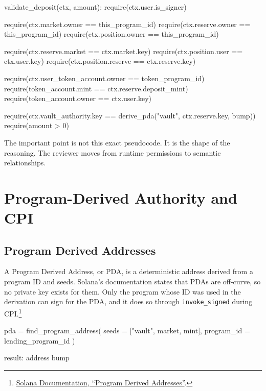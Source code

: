 \begin{codeblock}
validate_deposit(ctx, amount):
    require(ctx.user.is_signer)

    require(ctx.market.owner == this_program_id)
    require(ctx.reserve.owner == this_program_id)
    require(ctx.position.owner == this_program_id)

    require(ctx.reserve.market == ctx.market.key)
    require(ctx.position.user == ctx.user.key)
    require(ctx.position.reserve == ctx.reserve.key)

    require(ctx.user_token_account.owner == token_program_id)
    require(token_account.mint == ctx.reserve.deposit_mint)
    require(token_account.owner == ctx.user.key)

    require(ctx.vault_authority.key == derive_pda("vault", ctx.reserve.key, bump))
    require(amount > 0)
\end{codeblock}

The important point is not this exact pseudocode. It is the shape of the reasoning. The reviewer moves from runtime permissions to semantic relationships.

\section{Program-Derived Authority and CPI}

\subsection{Program Derived Addresses}

A Program Derived Address, or PDA, is a deterministic address derived from a program ID and seeds. Solana's documentation states that PDAs are off-curve, so no private key exists for them. Only the program whose ID was used in the derivation can sign for the PDA, and it does so through \texttt{invoke\_signed} during CPI.\footnote{\href{https://solana.com/docs/core/pda}{Solana Documentation, ``Program Derived Addresses''}.}

\begin{codeblock}
pda = find_program_address(
    seeds = ["vault", market, mint],
    program_id = lending_program_id
)

result:
    address
    bump
\end{codeblock}

